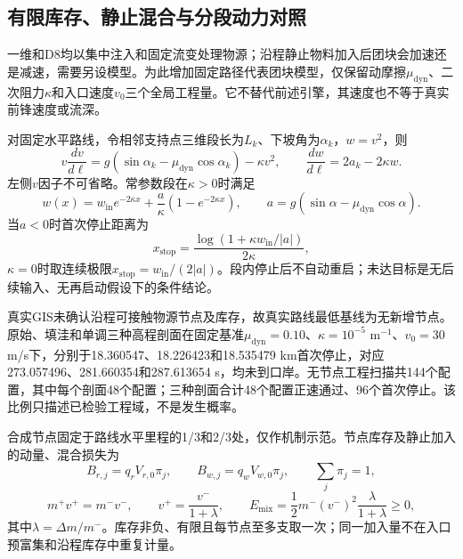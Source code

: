 \subsection{有限库存、静止混合与分段动力对照}
一维和D8均以集中注入和固定流变处理物源；沿程静止物料加入后团块会加速还是减速，需要另设模型。为此增加固定路径代表团块模型，仅保留动摩擦$\mu_{\mathrm{dyn}}$、二次阻力$\kappa$和入口速度$v_0$三个全局工程量。它不替代前述引擎，其速度也不等于真实前锋速度或流深。

对固定水平路线，令相邻支持点三维段长为$L_k$、下坡角为$\alpha_k$，$w=v^2$，则
\begin{equation}
v\frac{dv}{d\ell}
=g(\sin\alpha_k-\mu_{\mathrm{dyn}}\cos\alpha_k)-\kappa v^2,
\qquad
\frac{dw}{d\ell}=2a_k-2\kappa w.
\end{equation}
左侧$v$因子不可省略。常参数段在$\kappa>0$时满足
\begin{equation}
w(x)=w_{\mathrm{in}}e^{-2\kappa x}
+\frac{a}{\kappa}(1-e^{-2\kappa x}),
\qquad
a=g(\sin\alpha-\mu_{\mathrm{dyn}}\cos\alpha).
\end{equation}
当$a<0$时首次停止距离为
\begin{equation}
x_{\mathrm{stop}}
=\frac{\log\left(1+\kappa w_{\mathrm{in}}/|a|\right)}{2\kappa},
\end{equation}
$\kappa=0$时取连续极限$x_{\mathrm{stop}}=w_{\mathrm{in}}/(2|a|)$。段内停止后不自动重启；未达目标是无后续输入、无再启动假设下的条件结论。

真实GIS未确认沿程可接触物源节点及库存，故真实路线最低基线为无新增节点。原始、填洼和单调三种高程剖面在固定基准$\mu_{\mathrm{dyn}}=0.10$、$\kappa=10^{-5}$ m$^{-1}$、$v_0=30$ m/s下，分别于18.360547、18.226423和18.535479 km首次停止，对应273.057496、281.660354和287.613654 s，均未到口岸。无节点工程扫描共144个配置，其中每个剖面48个配置；三种剖面合计48个配置正速通过、96个首次停止。该比例只描述已检验工程域，不是发生概率。

合成节点固定于路线水平里程的1/3和2/3处，仅作机制示范。节点库存及静止加入的动量、混合损失为
\begin{equation}
B_{r,j}=q_rV_{r,0}\pi_j,\qquad
B_{w,j}=q_wV_{w,0}\pi_j,\qquad
\sum_j\pi_j=1,
\end{equation}
\begin{equation}
m^+v^+=m^-v^-,\qquad
v^+=\frac{v^-}{1+\lambda},
\qquad
E_{\mathrm{mix}}
=\frac12m^-(v^-)^2\frac{\lambda}{1+\lambda}\ge0,
\end{equation}
其中$\lambda=\Delta m/m^-$。库存非负、有限且每节点至多支取一次；同一加入量不在入口预富集和沿程库存中重复计量。

